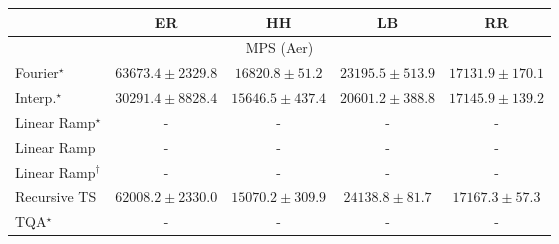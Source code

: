 \begin{tabular}{l|cccc|}
\toprule
            & ER & HH & LB & RR \\
\midrule
\multicolumn{5}{c}{\rule{0pt}{8pt}MPS (Aer)} \\
\midrule
Fourier$^\star$ & {\cellcolor[HTML]{800F7B}} \color[HTML]{F1F1F1} $63673.4\pm 2329.8$ & {\cellcolor[HTML]{EBF3F8}} \color[HTML]{000000} $16820.8\pm 51.2$ & {\cellcolor[HTML]{D2E2EE}} \color[HTML]{000000} $23195.5\pm 513.9$ & {\cellcolor[HTML]{EAF3F8}} \color[HTML]{000000} $17131.9\pm 170.1$ \\
Interp.$^\star$ & {\cellcolor[HTML]{B2CAE1}} \color[HTML]{000000} $30291.4\pm 8828.4$ & {\cellcolor[HTML]{EFF6FA}} \color[HTML]{000000} $15646.5\pm 437.4$ & {\cellcolor[HTML]{DFEBF4}} \color[HTML]{000000} $20601.2\pm 388.8$ & {\cellcolor[HTML]{EAF3F8}} \color[HTML]{000000} $17145.9\pm 139.2$ \\
Linear Ramp$^\star$ & {\cellcolor[HTML]{000000}} \color[HTML]{F1F1F1} {\cellcolor{white}} \color{black} - & {\cellcolor[HTML]{000000}} \color[HTML]{F1F1F1} {\cellcolor{white}} \color{black} - & {\cellcolor[HTML]{000000}} \color[HTML]{F1F1F1} {\cellcolor{white}} \color{black} - & {\cellcolor[HTML]{000000}} \color[HTML]{F1F1F1} {\cellcolor{white}} \color{black} - \\
Linear Ramp & {\cellcolor[HTML]{000000}} \color[HTML]{F1F1F1} {\cellcolor{white}} \color{black} - & {\cellcolor[HTML]{000000}} \color[HTML]{F1F1F1} {\cellcolor{white}} \color{black} - & {\cellcolor[HTML]{000000}} \color[HTML]{F1F1F1} {\cellcolor{white}} \color{black} - & {\cellcolor[HTML]{000000}} \color[HTML]{F1F1F1} {\cellcolor{white}} \color{black} - \\
Linear Ramp$^\dagger$ & {\cellcolor[HTML]{000000}} \color[HTML]{F1F1F1} {\cellcolor{white}} \color{black} - & {\cellcolor[HTML]{000000}} \color[HTML]{F1F1F1} {\cellcolor{white}} \color{black} - & {\cellcolor[HTML]{000000}} \color[HTML]{F1F1F1} {\cellcolor{white}} \color{black} - & {\cellcolor[HTML]{000000}} \color[HTML]{F1F1F1} {\cellcolor{white}} \color{black} - \\
Recursive TS & {\cellcolor[HTML]{831A83}} \color[HTML]{F1F1F1} $62008.2\pm 2330.0$ & {\cellcolor[HTML]{F1F7FA}} \color[HTML]{000000} $15070.2\pm 309.9$ & {\cellcolor[HTML]{CEDFEC}} \color[HTML]{000000} $24138.8\pm 81.7$ & {\cellcolor[HTML]{EAF3F8}} \color[HTML]{000000} $17167.3\pm 57.3$ \\
TQA$^\star$ & {\cellcolor[HTML]{000000}} \color[HTML]{F1F1F1} {\cellcolor{white}} \color{black} - & {\cellcolor[HTML]{000000}} \color[HTML]{F1F1F1} {\cellcolor{white}} \color{black} - & {\cellcolor[HTML]{000000}} \color[HTML]{F1F1F1} {\cellcolor{white}} \color{black} - & {\cellcolor[HTML]{000000}} \color[HTML]{F1F1F1} {\cellcolor{white}} \color{black} - \\

\end{tabular}
